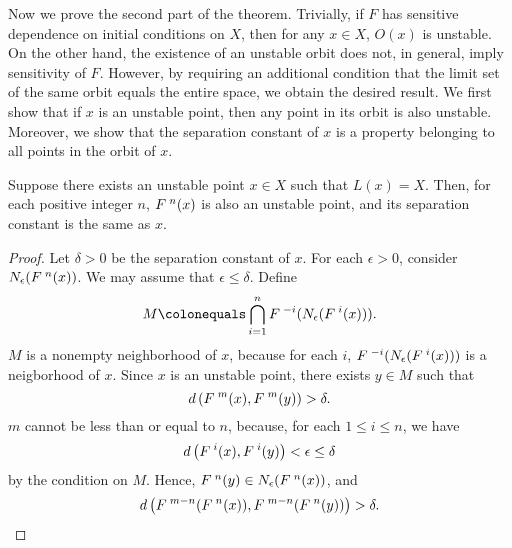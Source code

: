 \documentclass[10pt,draft,twoside]{book}
\begin{document}
Now we prove the second part of the theorem.
Trivially, if $F$ has sensitive dependence on initial conditions on $X$, then for any $x \in X$, $O(x)$ is unstable.
On the other hand, the existence of an unstable orbit does not, in general, imply sensitivity of $F$.
However, by requiring an additional condition that the limit set of the same orbit equals the entire space, we obtain the desired result.
We first show that if $x$ is an unstable point, then any point in its orbit is also unstable.
Moreover, we show that the separation constant of $x$ is a property belonging to all points in the orbit of $x$.
\begin{proposition}
  Suppose there exists an unstable point $x \in X$ such that $L(x) = X$.
  Then, for each positive integer $n$, $F^{\;n}(x)$ is also an unstable point, and its separation constant is the same as $x$.
  \label{prop:unstable-orbit}
  \begin{proof}
    Let $\delta > 0$ be the separation constant of $x$.
    For each $\epsilon > 0$, consider $N_{\epsilon}(F^{\;n}(x))$.
    We may assume that $\epsilon \leq \delta$.
    Define
    \begin{equation*}
      M \ceq \bigcap\limits_{i = 1}^n \itr{F}{-i}(\oball{\epsilon}{\itr{F}{i}(x)}).
    \end{equation*}
    $M$ is a nonempty neighborhood of $x$, because for each $i$, $F^{\;-i}(N_{\epsilon}(F^{\;i}(x)))$ is a neigborhood of $x$.
    Since $x$ is an unstable point, there exists $y \in M$ such that
    \begin{equation*}
      d\left(  F^{\;m}(x), F^{\;m}(y)  \right) > \delta.
    \end{equation*}
    $m$ cannot be less than or equal to $n$, because, for each $1 \leq i \leq n$, we have
    \begin{equation*}
      d\left(  F^{\;i}(x), F^{\;i}(y)  \right) < \epsilon \leq \delta
    \end{equation*}
    by the condition on $M$.
    Hence, $F^{\;n}(y) \in N_{\epsilon}(F^{\;n}(x))$, and
    \begin{equation*}
      d\left(  F^{\;m-n}(F^{\;n}(x)), F^{\;m-n}(F^{\;n}(y))  \right) > \delta.
    \end{equation*}

\end{proof}
\end{proposition}
\end{document}
